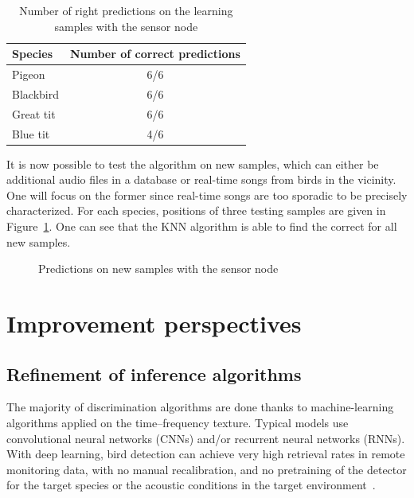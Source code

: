 \documentclass{EPL-master-thesis-covers-EN}
\begin{document}
\begin{table}[H]
\centering
\begin{tabular}{lc}
\toprule
 Species   & Number of correct predictions \\ \midrule
 Pigeon    & 6/6                           \\
 Blackbird & 6/6                           \\
 Great tit & 6/6                           \\
 Blue tit  & 4/6                           \\ \bottomrule
\end{tabular}
\caption{Number of right predictions on the learning samples with the sensor node}
\label{tab:predictions_birds}
\end{table}

It is now possible to test the algorithm on new samples, which can either be additional audio files in a database or real-time songs from birds in the vicinity. One will focus on the former since real-time songs are too sporadic to be precisely characterized. For each species, positions of three testing samples are given in Figure~\ref{fig:test_freq_detection}. One can see that the KNN algorithm is able to find the correct for all new samples.

\begin{figure}[H]
    \centering
    
    \caption{Predictions on new samples with the sensor node}
    \label{fig:test_freq_detection}
\end{figure}


\chapter{Improvement perspectives}
\label{chapter:improvements}

\section{Refinement of inference algorithms}

The majority of discrimination algorithms are done thanks to machine-learning algorithms applied on the time--frequency texture. Typical models use convolutional neural networks (CNNs) and/or recurrent neural networks (RNNs).
With deep learning, bird detection can achieve very high retrieval rates in remote monitoring data, with no manual recalibration, and no pretraining of the detector for the target species or the acoustic conditions in the target environment~\cite{Stowell2018}.
\end{document}
